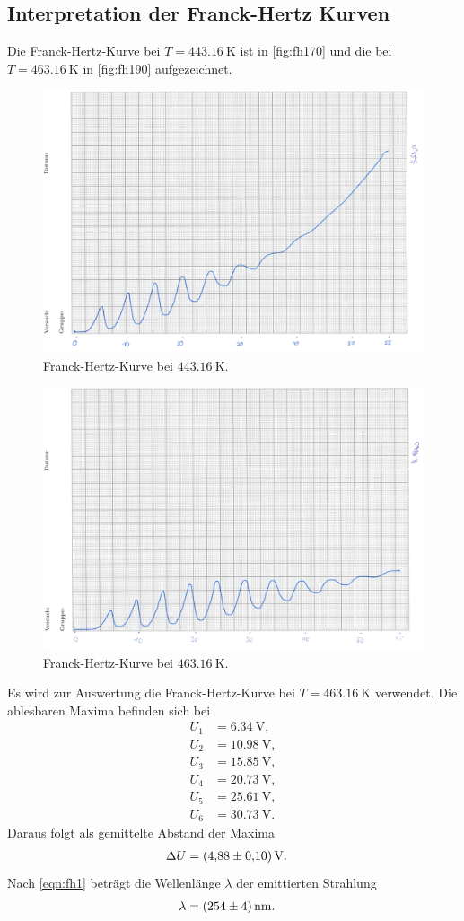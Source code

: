 \subsection{Interpretation der Franck-Hertz Kurven}
Die Franck-Hertz-Kurve bei $T = \SI{443,16}{\kelvin}$ ist in \autoref{fig:fh170} und die bei $T = \SI{463,16}{\kelvin}$ in \autoref{fig:fh190} aufgezeichnet.
\begin{figure}[H]
	\centering
	\includegraphics[width=0.7\linewidth]{data/Franck-Hertz170C.png}
	\caption{Franck-Hertz-Kurve bei $\SI{443,16}{\kelvin}$.}
	\label{fig:fh170}
\end{figure}

\begin{figure}[H]
	\centering
	\includegraphics[width=0.7\linewidth]{data/Franck-Hertz190C.png}
	\caption{Franck-Hertz-Kurve bei $\SI{463,16}{\kelvin}$.}
	\label{fig:fh190}
\end{figure}
Es wird zur Auswertung die Franck-Hertz-Kurve bei $T = \SI{463,16}{\kelvin}$ verwendet.
Die ablesbaren Maxima befinden sich bei
\begin{align*}
  U_1 &= \SI{6,34}{\volt}, \\
  U_2 &= \SI{10,98}{\volt}, \\
  U_3 &= \SI{15,85}{\volt},\\
  U_4 &= \SI{20,73}{\volt},\\
  U_5 &= \SI{25,61}{\volt},\\
  U_6 &= \SI{30,73}{\volt}.
\end{align*}
Daraus folgt als gemittelte Abstand der Maxima
\begin{align*}
  \Delta U &= \SI{4,88 \pm 0,1}{\volt}.
\end{align*}
Nach \autoref{eqn:fh1} beträgt die Wellenlänge $\lambda$ der emittierten Strahlung
\begin{align*}
  \lambda &= \SI{254+-4}{\nano\metre}.
\end{align*}